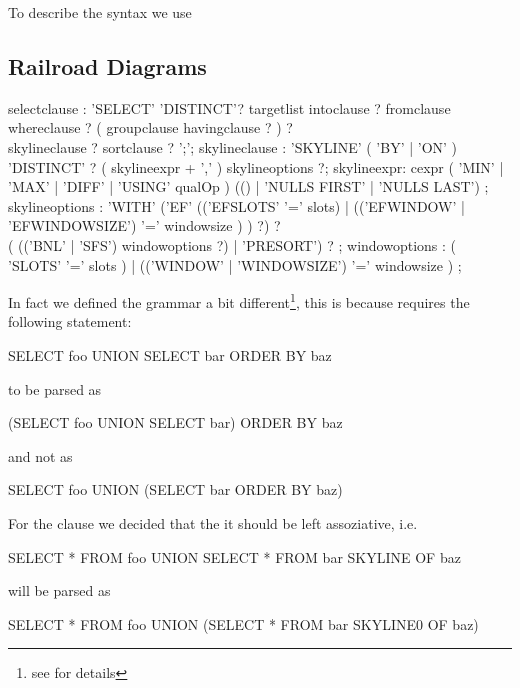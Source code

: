 To describe the syntax we use 
\subsection{Railroad Diagrams}


\railtermfont{\ttfamily\upshape\tiny}
\railboxheight 12pt
\railinit

\begin{rail}

selectclause : 'SELECT' 'DISTINCT'? targetlist intoclause ? fromclause \\ whereclause ? ( groupclause havingclause ? ) ? \\ skylineclause ? sortclause ? ';';
skylineclause : 'SKYLINE' ( 'BY' | 'ON' ) 'DISTINCT' ? ( skylineexpr + ',' ) skylineoptions ?;
skylineexpr: cexpr ( 'MIN' | 'MAX' | 'DIFF' | 'USING' qualOp ) (() | 'NULLS FIRST' | 'NULLS LAST') ;
skylineoptions : 'WITH' ('EF' (('EFSLOTS' '=' slots) | (('EFWINDOW' | 'EFWINDOWSIZE') '=' windowsize ) ) ?) ? \\ ( (('BNL' | 'SFS') windowoptions ?) | 'PRESORT') ? ;
windowoptions : ( 'SLOTS' '=' slots ) | (('WINDOW' | 'WINDOWSIZE') '=' windowsize ) ;

\end{rail}


In fact we defined the grammar a bit different\footnote{see  for details}, this is because  requires the following statement:
\begin{sql}SELECT foo UNION SELECT bar ORDER BY baz\end{sql}
to be parsed as 
\begin{sql}(SELECT foo UNION SELECT bar) ORDER BY baz\end{sql}
and not as
\begin{sql}SELECT foo UNION (SELECT bar ORDER BY baz)\end{sql}

\noindent{}For the  clause we decided that the it should be left
assoziative, i.e. 
\begin{sql}SELECT * FROM foo UNION SELECT * FROM bar SKYLINE OF baz\end{sql}
will be parsed as 
\begin{sql}SELECT * FROM foo UNION (SELECT * FROM bar SKYLINE0 OF baz)\end{sql}

